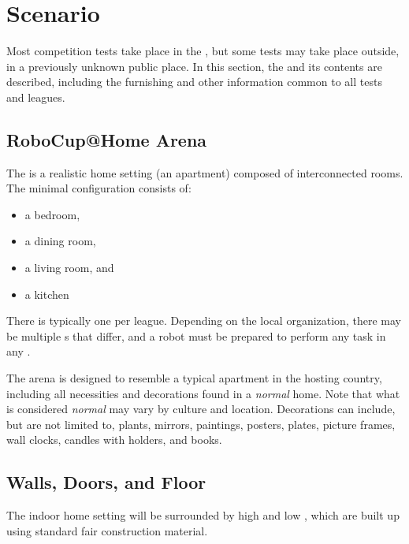 \section{Scenario}\label{sec:scenario}

Most competition tests take place in the \RoboCup\AtHome\Arena, but some tests may take place outside, in a previously unknown public place.
In this section, the \Arena{} and its contents are described, including the furnishing and other information common to all tests and leagues.

\subsection{RoboCup@Home Arena}

The \RoboCup\AtHome\Arena{} is a realistic home setting (an apartment) composed of interconnected rooms.
The minimal configuration consists of:
\begin{itemize}
	\item a bedroom,
	\item a dining room,
	\item a living room, and
	\item a kitchen
\end{itemize}
There is typically one \Arena{} per league. 
Depending on the local organization, there may be multiple \Arena{}s that differ, and a robot must be prepared to perform any task in any \Arena{}.

The arena is designed to resemble a typical apartment in the hosting country, including all necessities and decorations found in a \emph{normal} home.
Note that what is considered \emph{normal} may vary by culture and location.
Decorations can include, but are not limited to, plants, mirrors, paintings, posters, plates, picture frames, wall clocks, candles with holders, and books.

\subsection{Walls, Doors, and Floor}\label{rule:scenario_walls}

The indoor home setting will be surrounded by high and low , which are built up using standard fair construction material.

